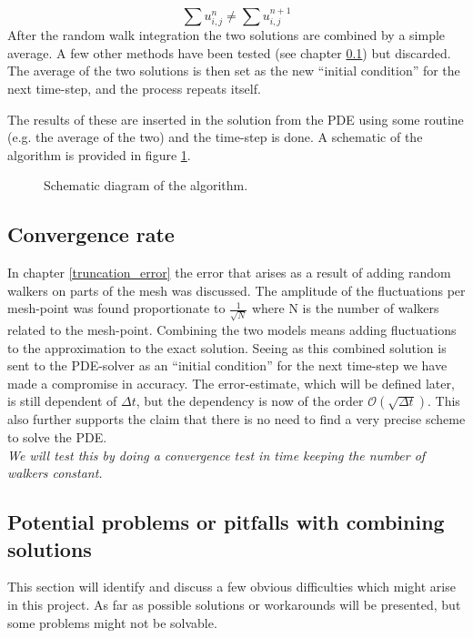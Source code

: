 \begin{equation}\label{integral_u}
 \sum u_{i,j}^n \neq \sum u_{i,j}^{n+1}
\end{equation}
After the random walk integration the two solutions are combined by a simple average. A few other methods have been tested (see chapter \ref{}) but discarded. 
The average of the two solutions is then set as the new ``initial condition'' for the next time-step, and the  process repeats itself.

The results of these are inserted in the solution from the PDE using some routine (e.g. the average of the two) and the time-step is done. 
A schematic of the algorithm is provided in figure \ref{schematic}.

\begin{figure}[H]
\centering
\caption[Algorithm]{Schematic diagram of the algorithm.}
\label{schematic}
\end{figure}

\subsection{Convergence rate}

In chapter \ref{truncation_error} the error that arises as a result of adding random walkers on parts of the mesh was discussed. 
The amplitude of the fluctuations per mesh-point was found proportionate to $\frac{1}{\sqrt{N}}$ where N is the number of walkers related to the mesh-point. 
Combining the two models means adding fluctuations to the approximation to the exact solution. Seeing as this combined solution is sent to the PDE-solver as an ``initial condition'' for the next time-step we have made a compromise in accuracy. The error-estimate, which will be defined later, is still dependent of $\Delta t$, but the dependency is now of the order $\mathcal{O}(\sqrt{\Delta t})$. 
This also further supports the claim that there is no need to find a very precise scheme to solve the PDE.\\
\emph{We will test this by doing a convergence test in time keeping the number of walkers constant.}

\subsection{Potential problems or pitfalls with combining solutions}\label{problems_and_pitfalls}
 
This section will identify and discuss a few obvious difficulties which might arise in this project. As far as possible solutions or workarounds will be presented, but some problems might not be solvable.

